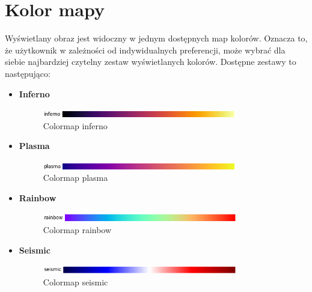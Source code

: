 \documentclass[a4paper,twoside,12pt]{book}
\begin{document}
\section{Kolor mapy}
Wyświetlany obraz jest widoczny w jednym dostępnych map kolorów. Oznacza to, że użytkownik w zależności od indywidualnych preferencji, może wybrać dla siebie najbardziej czytelny zestaw wyświetlanych kolorów. Dostępne zestawy to następująco:
\begin{itemize}
    \item \textbf{Inferno}
    
    \begin{figure}[H]
        \centering
        \includegraphics[width=0.8\textwidth]{../../images/Inferno.png}
        \caption{Colormap inferno}
        \label{fig:inferno}
    \end{figure}

    \item \textbf{Plasma}
    
    \begin{figure}[H]
        \centering
        \includegraphics[width=0.8\textwidth]{../../images/Plasma.png}
        \caption{Colormap plasma}
        \label{fig:plasma}
    \end{figure}

    \item \textbf{Rainbow}
    
    \begin{figure}[H]
        \centering
        \includegraphics[width=0.8\textwidth]{../../images/Rainbow.png}
        \caption{Colormap rainbow}
        \label{fig:rainbow}
    \end{figure}

    \item \textbf{Seismic}
    
    \begin{figure}[H]
        \centering
        \includegraphics[width=0.8\textwidth]{../../images/Seismic.png}
        \caption{Colormap seismic}
        \label{fig:seismic}
    \end{figure}


\end{itemize}
\end{document}
